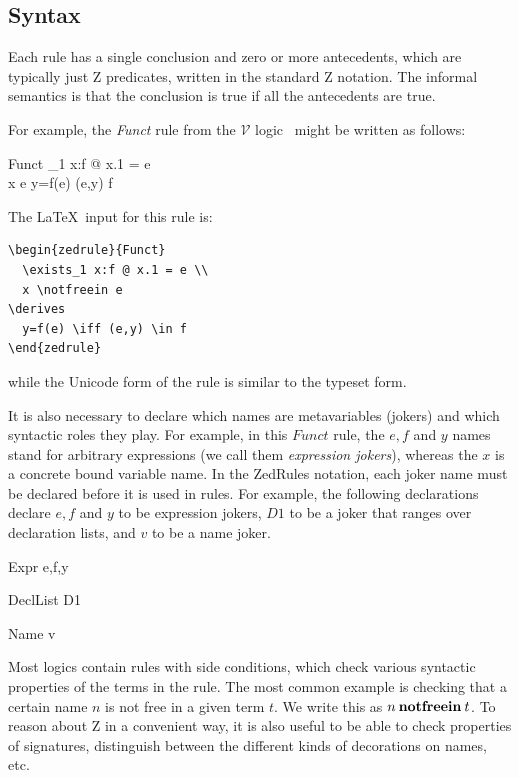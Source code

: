\documentclass{entcs}
\newcommand{\V}{\mathcal{V}}
\begin{document}
\subsection{Syntax}

Each rule has a single conclusion and zero or more antecedents, which are
typically just Z predicates, written in the standard Z notation.  The
informal semantics is that the conclusion is true if all the antecedents
are true.

For example, the \emph{Funct} rule from the $\V$
logic~\cite{brien:calculus-schemas-z00} might be written as follows:
\begin{zedrule}{Funct}
  \exists_1 x:f @ x.1 = e \\
  x \notfreein e
\derives
  y=f(e) \iff (e,y) \in f
\end{zedrule}

The \LaTeX\ input for this rule is:
\begin{verbatim}
\begin{zedrule}{Funct}
  \exists_1 x:f @ x.1 = e \\
  x \notfreein e
\derives
  y=f(e) \iff (e,y) \in f
\end{zedrule}
\end{verbatim}
while the Unicode form of the rule is similar to the typeset form.

It is also necessary to declare which names are metavariables
(jokers) and which syntactic roles they play.  For example, in
this $Funct$ rule, the $e,f$ and $y$ names stand for arbitrary
expressions (we call them \emph{expression jokers}), whereas the $x$
is a concrete bound variable name.  In the ZedRules notation, each
joker name must be declared before it is used in rules.  For example,
the following declarations declare $e,f$ and $y$ to be expression
jokers, $D1$ to be a joker that ranges over declaration lists, and
$v$ to be a name joker.

\begin{zedjoker}{Expr} e,f,y \end{zedjoker}
\begin{zedjoker}{DeclList} D1 \end{zedjoker}
\begin{zedjoker}{Name} v \end{zedjoker}

Most logics contain rules with side conditions, which check various
syntactic properties of the terms in the rule.  The most common
example is checking that a certain name $n$ is not free in a given
term $t$.  We write this as $n \mathbin{\mathop{\mathstrut{\mbox{\textbf{notfreein}}}}\nolimits} t$.  To reason about Z in a
convenient way, it is also useful to be able to check properties of
signatures, distinguish between the different kinds of decorations on
names, etc.
\end{document}
